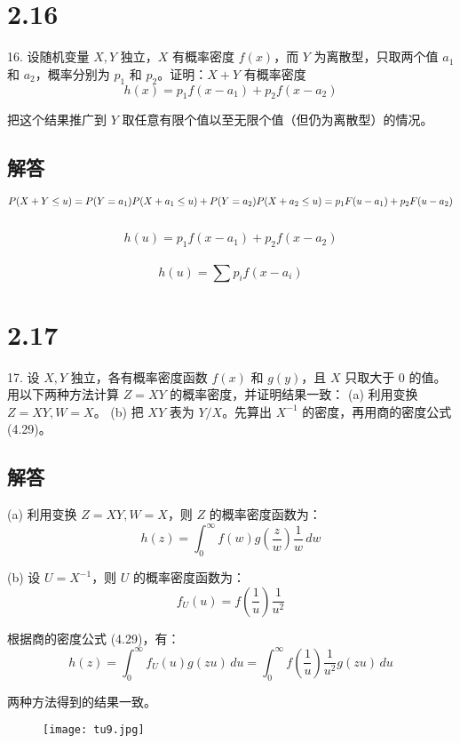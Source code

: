 \documentclass[UTF8]{report}
\theoremstyle{MyLineTheoremStyle} %
\theoremstyle{MyBlockTheoremStyle} %
\theoremstyle{MySubsubsectionStyle} %
\begin{document}
\section{2.16}

16. 设随机变量 \(X, Y\) 独立，\(X\) 有概率密度 \(f(x)\)，而 \(Y\) 为离散型，只取两个值 \(a_1\) 和 \(a_2\)，概率分别为 \(p_1\) 和 \(p_2\)。证明：\(X + Y\) 有概率密度
\[
h(x) = p_1 f(x - a_1) + p_2 f(x - a_2)
\]

把这个结果推广到 \(Y\) 取任意有限个值以至无限个值（但仍为离散型）的情况。

\subsection*{解答}

\[
P(X + Y \leq u) = P(Y = a_1) P(X + a_1 \leq u) + P(Y = a_2) P(X + a_2 \leq u)\\
= p_1 F(u - a_1) + p_2 F(u - a_2)\\
\]
\\
\[
h(u) = p_1 f(x - a_1) + p_2 f(x - a_2)
\]
\\
\[
    h(u) = \sum p_i f(x - a_i)
\]

\section{2.17}

17. 设 \(X, Y\) 独立，各有概率密度函数 \(f(x)\) 和 \(g(y)\)，且 \(X\) 只取大于 0 的值。用以下两种方法计算 \(Z = XY\) 的概率密度，并证明结果一致：
(a) 利用变换 \(Z = XY, W = X\)。
(b) 把 \(XY\) 表为 \(Y/X\)。先算出 \(X^{-1}\) 的密度，再用商的密度公式 (4.29)。

\subsection*{解答}

(a) 利用变换 \(Z = XY, W = X\)，则 \(Z\) 的概率密度函数为：
\[
h(z) = \int_{0}^{\infty} f(w) g\left(\frac{z}{w}\right) \frac{1}{w} \, dw
\]

(b) 设 \(U = X^{-1}\)，则 \(U\) 的概率密度函数为：
\[
f_U(u) = f\left(\frac{1}{u}\right) \frac{1}{u^2}
\]

根据商的密度公式 (4.29)，有：
\[
h(z) = \int_{0}^{\infty} f_U(u) g(zu) \, du = \int_{0}^{\infty} f\left(\frac{1}{u}\right) \frac{1}{u^2} g(zu) \, du
\]

两种方法得到的结果一致。

\begin{figure}[H]
    \centering
    \texttt{[image: tu9.jpg]}
\end{figure}
\end{document}
